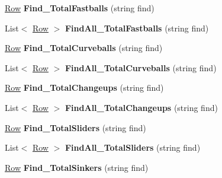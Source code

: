 \begin{DoxyCompactItemize}
\item 
\hyperlink{class_stats_script_1_1_row}{Row} {\bfseries Find\+\_\+\+Total\+Fastballs} (string find)\hypertarget{class_stats_script_a5adc72c6ff4c0a7ca21acc3fa5d1c362}{}\label{class_stats_script_a5adc72c6ff4c0a7ca21acc3fa5d1c362}

\item 
List$<$ \hyperlink{class_stats_script_1_1_row}{Row} $>$ {\bfseries Find\+All\+\_\+\+Total\+Fastballs} (string find)\hypertarget{class_stats_script_ae79ad419ecceace97c623aeb6e80afd5}{}\label{class_stats_script_ae79ad419ecceace97c623aeb6e80afd5}

\item 
\hyperlink{class_stats_script_1_1_row}{Row} {\bfseries Find\+\_\+\+Total\+Curveballs} (string find)\hypertarget{class_stats_script_af1891bd713f351ca4c0c71c0b73d7b08}{}\label{class_stats_script_af1891bd713f351ca4c0c71c0b73d7b08}

\item 
List$<$ \hyperlink{class_stats_script_1_1_row}{Row} $>$ {\bfseries Find\+All\+\_\+\+Total\+Curveballs} (string find)\hypertarget{class_stats_script_af45b9fbf5569303862b3be11801c4b85}{}\label{class_stats_script_af45b9fbf5569303862b3be11801c4b85}

\item 
\hyperlink{class_stats_script_1_1_row}{Row} {\bfseries Find\+\_\+\+Total\+Changeups} (string find)\hypertarget{class_stats_script_a7688f83e51ec96e3d40f428a1628c595}{}\label{class_stats_script_a7688f83e51ec96e3d40f428a1628c595}

\item 
List$<$ \hyperlink{class_stats_script_1_1_row}{Row} $>$ {\bfseries Find\+All\+\_\+\+Total\+Changeups} (string find)\hypertarget{class_stats_script_a0d0caec9a06ce59b09befe3fa8e7589a}{}\label{class_stats_script_a0d0caec9a06ce59b09befe3fa8e7589a}

\item 
\hyperlink{class_stats_script_1_1_row}{Row} {\bfseries Find\+\_\+\+Total\+Sliders} (string find)\hypertarget{class_stats_script_adffe06678826a0fed07275a6783a12d0}{}\label{class_stats_script_adffe06678826a0fed07275a6783a12d0}

\item 
List$<$ \hyperlink{class_stats_script_1_1_row}{Row} $>$ {\bfseries Find\+All\+\_\+\+Total\+Sliders} (string find)\hypertarget{class_stats_script_aafd9c47ed9f9db208d25654c66c931dc}{}\label{class_stats_script_aafd9c47ed9f9db208d25654c66c931dc}

\item 
\hyperlink{class_stats_script_1_1_row}{Row} {\bfseries Find\+\_\+\+Total\+Sinkers} (string find)\hypertarget{class_stats_script_aa9798e17ece64b73aba5677ccce3ce60}{}\label{class_stats_script_aa9798e17ece64b73aba5677ccce3ce60}


\end{DoxyCompactItemize}
